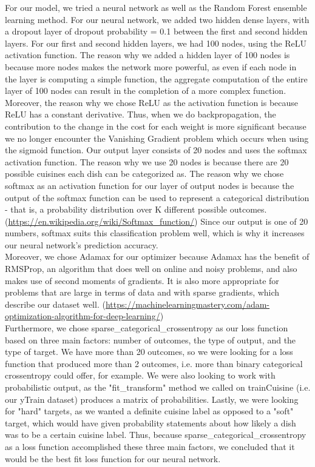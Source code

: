\documentclass[11pt]{article}
\begin{document}
For our model, we tried a neural network as well as the Random Forest ensemble learning
method. For our neural network, we added two hidden dense layers, with a
dropout layer of dropout probability = 0.1 between the first and second hidden
layers. For our first and second hidden layers, we had 100 nodes, using the ReLU
activation function. The reason why we added a hidden layer of 100 nodes
is because more nodes makes the network more powerful, as even if
each node in the layer is computing a simple function, the aggregate computation
of the entire layer of 100 nodes can result in the completion of a more
complex function. Moreover, the reason why we chose ReLU as the activation function is because
ReLU has a constant derivative. Thus, when we do backpropagation, the contribution
to the change in the cost for each weight is more significant because
we no longer encounter the Vanishing Gradient problem which occurs when using the
sigmoid function. Our output layer consists of 20 nodes and uses the softmax
activation function. The reason why we use 20 nodes is because there are 20
possible cuisines each dish can be categorized as. The reason why we chose softmax as an activation function for our layer of
output nodes is because the output of the softmax function can be used to
represent a categorical distribution - that is, a probability distribution
over K different possible outcomes. (\url{https://en.wikipedia.org/wiki/Softmax_function/})
Since our output is one of 20 numbers, softmax suits this classification problem
well, which is why it increases our neural network's prediction accuracy. \\

Moreover, we chose Adamax for our optimizer because Adamax has the benefit of RMSProp,
an algorithm that does well on online and noisy problems, and also makes
use of second moments of gradients. It is also more appropriate for problems
that are large in terms of data and with sparse gradients, which describe our
dataset well. (\url{https://machinelearningmastery.com/adam-optimization-algorithm-for-deep-learning/}) \\

Furthermore, we chose sparse\_categorical\_crossentropy as our loss function
based on three main factors: number of outcomes, the type of output, and the
type of target. We have more than 20 outcomes, so we were looking for a loss
function that produced more than 2 outcomes, i.e. more than binary categorical
crossentropy could offer, for example. We were also looking to work with
probabilistic output, as the "fit\_transform" method we called on trainCuisine
(i.e. our yTrain dataset) produces a matrix of probabilities. Lastly, we were
looking for "hard" targets, as we wanted a definite cuisine label as opposed to
a "soft" target, which would have given probability statements about how likely
a dish was to be a certain cuisine label. Thus, because sparse\_categorical\_crossentropy
as a loss function accomplished these three main factors, we concluded that
it would be the best fit loss function for our neural network. \\
\end{document}
